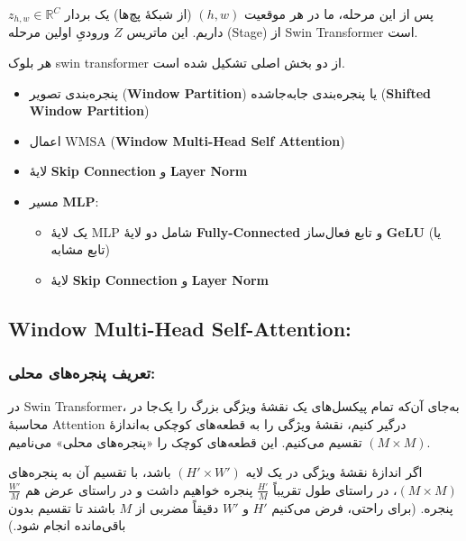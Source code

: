 پس از این مرحله، ما در هر موقعیت \((h, w)\) (از شبکهٔ پچ‌ها) یک بردار 
\(\displaystyle z_{h,w} \in \mathbb{R}^{C}\) داریم. این ماتریس \(\displaystyle Z\) 
ورودیِ اولین مرحله (Stage) از Swin Transformer است.



هر بلوک swin transformer  از دو بخش اصلی تشکیل شده است.

\begin{itemize}
	\item پنجره‌بندی تصویر (\textbf{Window Partition}) 
	یا پنجره‌بندی جابه‌جاشده (\textbf{Shifted Window Partition})
	
	\item اعمال \(\mathrm{WMSA}\) (\textbf{Window Multi-Head Self Attention})
	
	\item لایهٔ \textbf{Skip Connection} و \textbf{Layer Norm}
	
	\item مسیر \textbf{MLP}:
	\begin{itemize}
		\item یک لایهٔ MLP شامل دو لایهٔ \textbf{Fully-Connected} 
		و تابع فعال‌ساز \textbf{GeLU} (یا تابع مشابه)
		\item لایهٔ \textbf{Skip Connection} و \textbf{Layer Norm}
	\end{itemize}
\end{itemize}



\subsection{Window Multi-Head Self-Attention:}


\subsubsection{ تعریف پنجره‌های محلی:}

در Swin Transformer، به‌جای آن‌که تمام پیکسل‌های یک نقشهٔ ویژگی بزرگ را یک‌جا 
در محاسبهٔ Attention درگیر کنیم، نقشهٔ ویژگی را به قطعه‌های کوچکی به‌اندازهٔ 
\(\displaystyle (M \times M)\) تقسیم می‌کنیم. این قطعه‌های کوچک را 
«پنجره‌های محلی» می‌نامیم.

اگر اندازهٔ نقشهٔ ویژگی در یک لایه 
\(\displaystyle (H' \times W')\) باشد، 
با تقسیم آن به پنجره‌های 
\(\displaystyle (M \times M)\)، 
در راستای طول تقریباً 
\(\displaystyle \tfrac{H'}{M}\) پنجره خواهیم داشت 
و در راستای عرض هم 
\(\displaystyle \tfrac{W'}{M}\) پنجره.
(برای راحتی، فرض می‌کنیم 
\(\displaystyle H'\) و \(\displaystyle W'\) 
دقیقاً مضربی از \(\displaystyle M\) باشند 
تا تقسیم بدون باقی‌مانده انجام شود.)

